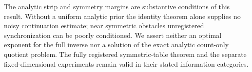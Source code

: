 The analytic strip and symmetry margins are substantive conditions of
this result. Without a uniform analytic prior the identity theorem alone
supplies no noisy continuation estimate; near symmetric obstacles
unregistered synchronization can be poorly conditioned. We assert
neither an optimal exponent for the full inverse nor a solution of the
exact analytic count-only quotient problem. The fully registered
symmetric-table theorem and the separate fixed-dimensional experiments
remain valid in their stated information categories.

